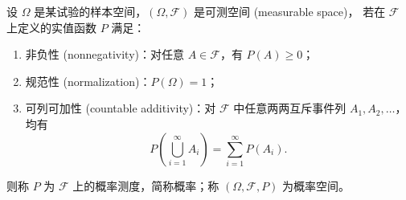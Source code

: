 \begin{definition}[概率空间]
设 $\Omega$ 是某试验的样本空间，$(\Omega,\mathcal{F})$ 是可测空间 (measurable space)，
若在 $\mathcal{F}$ 上定义的实值函数 $P$ 满足：
\begin{enumerate}
  \item 非负性 (nonnegativity)：对任意 $A \in \mathcal{F}$，有 $P(A) \geq 0$；
  \item 规范性 (normalization)：$P(\Omega) = 1$；
  \item 可列可加性 (countable additivity)：对 $\mathcal{F}$ 中任意两两互斥事件列 $A_1,A_2,\dots$，均有
  \[
  P\!\left(\bigcup_{i=1}^\infty A_i\right) = \sum_{i=1}^\infty P(A_i).
  \]
\end{enumerate}
则称 $P$ 为 $\mathcal{F}$ 上的概率测度，简称概率；称 $(\Omega,\mathcal{F},P)$ 为概率空间。
\end{definition}

